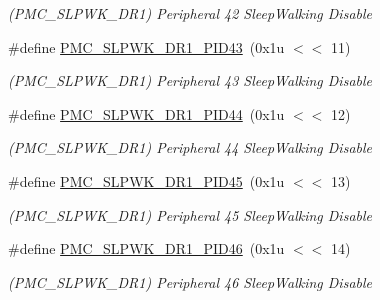 \begin{DoxyCompactItemize}
\begin{DoxyCompactList}\small\item\em (P\+M\+C\+\_\+\+S\+L\+P\+W\+K\+\_\+\+D\+R1) Peripheral 42 Sleep\+Walking Disable \end{DoxyCompactList}\item 
\mbox{\label{group__SAME70__PMC_ga1ceeb837db278ec8d1ef2f60bf87cef1}} 
\#define \mbox{\hyperlink{group__SAME70__PMC_ga1ceeb837db278ec8d1ef2f60bf87cef1}{P\+M\+C\+\_\+\+S\+L\+P\+W\+K\+\_\+\+D\+R1\+\_\+\+P\+I\+D43}}~(0x1u $<$$<$ 11)
\begin{DoxyCompactList}\small\item\em (P\+M\+C\+\_\+\+S\+L\+P\+W\+K\+\_\+\+D\+R1) Peripheral 43 Sleep\+Walking Disable \end{DoxyCompactList}\item 
\mbox{\label{group__SAME70__PMC_ga60b5b21abf5e51bf745b1cd41afe93dd}} 
\#define \mbox{\hyperlink{group__SAME70__PMC_ga60b5b21abf5e51bf745b1cd41afe93dd}{P\+M\+C\+\_\+\+S\+L\+P\+W\+K\+\_\+\+D\+R1\+\_\+\+P\+I\+D44}}~(0x1u $<$$<$ 12)
\begin{DoxyCompactList}\small\item\em (P\+M\+C\+\_\+\+S\+L\+P\+W\+K\+\_\+\+D\+R1) Peripheral 44 Sleep\+Walking Disable \end{DoxyCompactList}\item 
\mbox{\label{group__SAME70__PMC_gad070a6e877cf1a5db6f28d65a5aeb067}} 
\#define \mbox{\hyperlink{group__SAME70__PMC_gad070a6e877cf1a5db6f28d65a5aeb067}{P\+M\+C\+\_\+\+S\+L\+P\+W\+K\+\_\+\+D\+R1\+\_\+\+P\+I\+D45}}~(0x1u $<$$<$ 13)
\begin{DoxyCompactList}\small\item\em (P\+M\+C\+\_\+\+S\+L\+P\+W\+K\+\_\+\+D\+R1) Peripheral 45 Sleep\+Walking Disable \end{DoxyCompactList}\item 
\mbox{\label{group__SAME70__PMC_ga7e9a3273aacfe6cce7bd9c1b7839e00d}} 
\#define \mbox{\hyperlink{group__SAME70__PMC_ga7e9a3273aacfe6cce7bd9c1b7839e00d}{P\+M\+C\+\_\+\+S\+L\+P\+W\+K\+\_\+\+D\+R1\+\_\+\+P\+I\+D46}}~(0x1u $<$$<$ 14)
\begin{DoxyCompactList}\small\item\em (P\+M\+C\+\_\+\+S\+L\+P\+W\+K\+\_\+\+D\+R1) Peripheral 46 Sleep\+Walking Disable \end{DoxyCompactList}\item 

\end{DoxyCompactItemize}
